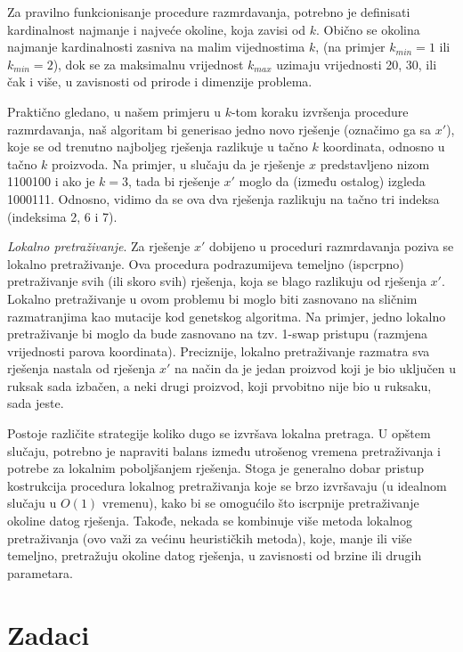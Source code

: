 \documentclass[a4paper, utf8, 11pt, colorlinks]{book}
\begin{document}
Za pravilno funkcionisanje procedure razmrdavanja, potrebno je definisati kardinalnost najmanje i najveće okoline, koja zavisi od $k$. Obično se okolina najmanje kardinalnosti zasniva na malim vijednostima $k$, (na primjer $k_{min}=1$ ili $k_{min}=2$), dok se za maksimalnu vrijednost $k_{max}$  uzimaju vrijednosti 20, 30, ili čak i više, u zavisnosti od prirode i dimenzije problema.

Praktično gledano, u našem primjeru u $k$-tom koraku izvršenja procedure razmrdavanja, naš algoritam bi generisao jedno novo rješenje (označimo ga sa $x'$), koje se od trenutno najboljeg rješenja razlikuje u tačno $k$ koordinata, odnosno u tačno $k$ proizvoda. Na primjer, u slučaju da je rješenje $x$ predstavljeno nizom 1100100 i ako je $k=3$, tada bi rješenje    $x'$ moglo da  (između ostalog) izgleda
1000111. Odnosno, vidimo da se ova dva rješenja razlikuju na tačno tri indeksa (indeksima 2, 6 i 7).

\emph{Lokalno pretraživanje}. 
Za rješenje  $x'$ dobijeno u  proceduri razmrdavanja poziva se lokalno pretraživanje. Ova procedura podrazumijeva temeljno (ispcrpno) pretraživanje svih (ili skoro svih) rješenja, koja se blago razlikuju od rješenja  $x'$. Lokalno pretraživanje u ovom problemu bi moglo biti zasnovano na sličnim razmatranjima kao mutacije kod genetskog algoritma. Na primjer, jedno lokalno pretraživanje bi moglo da bude zasnovano na tzv. 1-swap pristupu (razmjena vrijednosti parova koordinata). Preciznije, lokalno pretraživanje razmatra sva rješenja nastala od rješenja $x'$ na način da je jedan proizvod koji je bio uključen u ruksak sada izbačen, a neki drugi proizvod, koji prvobitno nije bio u ruksaku, sada jeste.

Postoje različite strategije koliko dugo se izvršava lokalna pretraga. U opštem slučaju, potrebno je napraviti balans između utrošenog vremena pretraživanja i potrebe za lokalnim poboljšanjem rješenja. Stoga je generalno dobar pristup kostrukcija  procedura lokalnog pretraživanja koje se brzo izvršavaju (u idealnom slučaju u $O(1)$ vremenu), kako bi se omogućilo što iscrpnije pretraživanje okoline datog rješenja. Takođe, nekada se kombinuje više metoda lokalnog pretraživanja (ovo važi za većinu heurističkih metoda), koje, manje ili više temeljno, pretražuju okoline datog rješenja, u zavisnosti od brzine ili drugih parametara.



\section{Zadaci}
\end{document}

